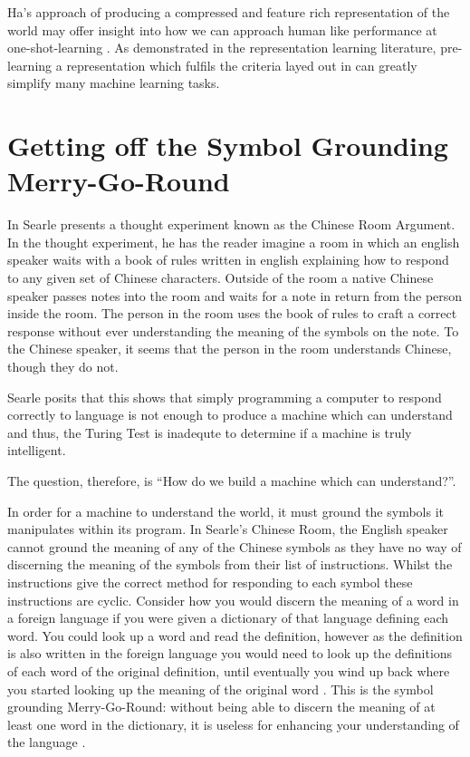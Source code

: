 Ha's approach of producing a compressed and feature rich representation of the world \cite{ha2018world, ha2018recurrent} may offer insight into how we can approach human like performance at one-shot-learning \cite{vinyals2016matching}. As demonstrated in the representation learning literature, pre-learning a representation which fulfils the criteria layed out in \cite{repRev} can greatly simplify many machine learning tasks.


\section{Getting off the Symbol Grounding Merry-Go-Round} 
In \cite{searle1980minds} Searle presents a thought experiment known as the Chinese Room Argument. In the thought experiment, he has the reader imagine a room in which an english speaker waits with a book of rules written in english explaining how to respond to any given set of Chinese characters. Outside of the room a native Chinese speaker passes notes into the room and waits for a note in return from the person inside the room. The person in the room uses the book of rules to craft a correct response without ever understanding the meaning of the symbols on the note. To the Chinese speaker, it seems that the person in the room understands Chinese, though they do not.

Searle posits that this shows that simply programming a computer to respond correctly to language is not enough to produce a machine which can understand and thus, the Turing Test \cite{turing2009computing} is inadequte to determine if a machine is truly intelligent.

The question, therefore, is ``How do we build a machine which can understand?''.

In order for a machine to understand the world, it must ground the symbols it manipulates within its program. In Searle's Chinese Room, the English speaker cannot ground the meaning of any of the Chinese symbols as they have no way of discerning the meaning of the symbols from their list of instructions. Whilst the instructions give the correct method for responding to each symbol these instructions are cyclic. Consider how you would discern the meaning of a word in a foreign language if you were given a dictionary of that language defining each word. You could look up a word and read the definition, however as the definition is also written in the foreign language you would need to look up the definitions of each word of the original definition, until eventually you wind up back where you started looking up the meaning of the original word \cite{cangelosi2000robotic}. This is the symbol grounding Merry-Go-Round: without being able to discern the meaning of at least one word in the dictionary, it is useless for enhancing your understanding of the language \cite{harnad1990symbol}.

